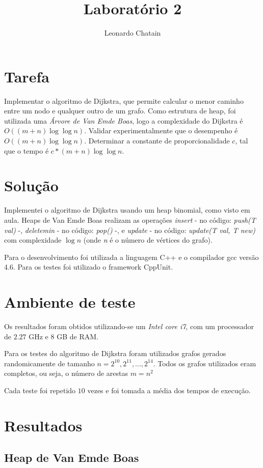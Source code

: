 \documentclass{article}
\title{Laboratório 2}
\author{Leonardo Chatain}
\begin{document}
\maketitle

\section{Tarefa}
Implementar o algoritmo de Dijkstra, que permite calcular o menor caminho entre um nodo e qualquer outro de um grafo. Como estrutura de heap, foi utilizada uma \emph{Árvore de Van Emde Boas}, logo a complexidade do Dijkstra é $O((m + n) \log\log n)$. Validar experimentalmente que o desempenho é $O((m + n) \log\log n)$. Determinar a constante de proporcionalidade $c$, tal que o tempo é $c*(m + n) \log\log n$.

\section{Solução}
Implementei o algoritmo de Dijkstra usando um heap binomial, como visto em aula. Heaps de Van Emde Boas realizam as operações \emph{insert} - no código: \emph{push(T val)} -, \emph{deletemin} - no código: \emph{pop()} -, e \emph{update} - no código: \emph{update(T val, T new)} com complexidade $ \log n $ (onde \emph{n} é o número de vértices do grafo).

Para o desenvolvimento foi utilizada a linguagem C++ e o compilador gcc versão 4.6. Para os testes foi utilizado o framework CppUnit.

\section{Ambiente de teste}

Os resultados foram obtidos utilizando-se um \emph{Intel core i7}, com um processador de $2.27$ GHz e $8$ GB de RAM.

Para os testes do algoritmo de Dijkstra foram utilizados grafos gerados randomicamente de tamanho $n=2^10,2^11,\ldots,2^14$. Todos os grafos utilizados eram completos, ou seja, o número de arestas $m=n ^ 2$

Cada teste foi repetido $10$ vezes e foi tomada a média dos tempos de execução.

\section{Resultados}

\subsection{Heap de Van Emde Boas}
\end{document}
